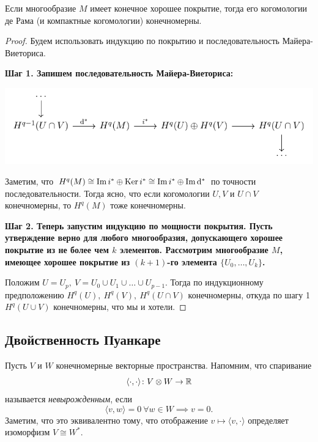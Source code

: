 	\begin{statement} 
			Если многообразие $M$ имеет конечное хорошее покрытие, тогда его когомологии де Рама (и компактные когомологии) конечномерны. 
	\end{statement}	
	\begin{proof}
		Будем использовать индукцию по покрытию и последовательность Майера-Виеториса. 

		\noindent\bf{Шаг 1.} Запишем последовательность Майера-Виеториса:

		\begin{center}
			\includegraphics{lectures/7/pictures/cd_17.pdf}
		\end{center}		

		Заметим, что $H^q(M) \cong \mathop{\mathrm{Im}}\nolimits{i^*} \oplus \operatorname{Ker}{i^*} \cong \mathop{\mathrm{Im}}\nolimits{i^*} \oplus \mathop{\mathrm{Im}}\nolimits{\mathrm{d}^*}$ по точности последовательности. Тогда ясно, что если когомологии $U, V$ и  $U \cap V$ конечномерны, то  $H^q(M)$ тоже конечномерны. 

		\noindent\bf{Шаг 2.} Теперь запустим индукцию по мощности покрытия. Пусть утверждение верно для любого многообразия, допускающего хорошее покрытие из не более чем $k$ элементов. Рассмотрим многообразие $M$, имеющее хорошее покрытие из $(k + 1)$-го элемента $\{ U_0, \ldots, U_k \}$. 

		Положим $U = U_p, \ V = U_0 \cup U_1 \cup \ldots \cup U_{p - 1}$. Тогда по индукционному предположению $H^q(U), \ H^q(V), \ H^q(U \cap V)$ конечномерны, откуда по шагу 1 $H^q(U \cup V)$ конечномерны, что мы и хотели.  
 	\end{proof}	

 	\subsection{Двойственность Пуанкаре}

 	Пусть $V$ и $W$ конечномерные векторные пространства. Напомним, что спаривание 
 	\[
 		\langle \cdot, \cdot \rangle\colon  V \otimes W \to \mathbb{R} 
 	\]
 	 называется \emph{невырожденным}, если 
 	 \[ 
 	 	\langle v, w \rangle = 0 \ \forall w \in W \implies v = 0.
 	 \]
 	 Заметим, что это эквивалентно тому, что отображение $v \mapsto \langle v, \cdot \rangle$ определяет изоморфизм $V \cong W^*$.


